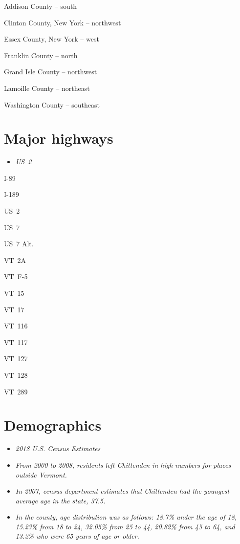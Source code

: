 Addison County -- south

Clinton County, New York -- northwest

Essex County, New York -- west

Franklin County -- north

Grand Isle County -- northwest

Lamoille County -- northeast

Washington County -- southeast

\section{Major highways}\label{major-highways}

\begin{itemize}
\item
  \emph{US~2}
\end{itemize}

I-89

I-189

US~2

US~7

US~7 Alt.

VT~2A

VT~F-5

VT~15

VT~17

VT~116

VT~117

VT~127

VT~128

VT~289

\section{Demographics}\label{demographics}

\begin{itemize}
\item
  \emph{2018 U.S. Census Estimates}
\item
  \emph{From 2000 to 2008, residents left Chittenden in high numbers for
  places outside Vermont.}
\item
  \emph{In 2007, census department estimates that Chittenden had the
  youngest average age in the state, 37.5.}
\item
  \emph{In the county, age distribution was as follows: 18.7\% under the
  age of 18, 15.23\% from 18 to 24, 32.05\% from 25 to 44, 20.82\% from
  45 to 64, and 13.2\% who were 65 years of age or older.}
\end{itemize}

